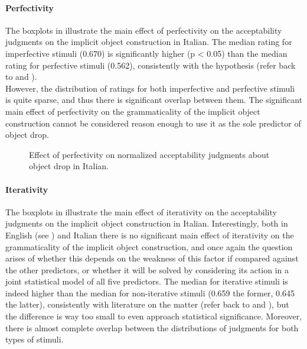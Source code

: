 \paragraph{Perfectivity}
The boxplots in  illustrate the main effect of perfectivity on the acceptability judgments on the implicit object construction in Italian. The median rating for imperfective stimuli (0.670) is significantly higher (p < 0.05) than the median rating for perfective stimuli (0.562), consistently with the hypothesis (refer back to  and ).\\
However, the distribution of ratings for both imperfective and perfective stimuli is quite sparse, and thus there is significant overlap between them. The significant main effect of perfectivity on the grammaticality of the implicit object construction cannot be considered reason enough to use it as the sole predictor of object drop.

\begin{figure}[htb]
\caption{Effect of perfectivity on normalized acceptability judgments about object drop in Italian.}
    
\end{figure}

\paragraph{Iterativity}
The boxplots in  illustrate the main effect of iterativity on the acceptability judgments on the implicit object construction in Italian. Interestingly, both in English (see ) and Italian there is no significant main effect of iterativity on the grammaticality of the implicit object construction, and once again the question arises of whether this depends on the weakness of this factor if compared against the other predictors, or whether it will be solved by considering its action in a joint statistical model of all five predictors. The median for iterative stimuli is indeed higher than the median for non-iterative stimuli (0.659 the former, 0.645 the latter), consistently with literature on the matter (refer back to  and ), but the difference is way too small to even approach statistical significance. Moreover, there is almost complete overlap between the distributions of judgments for both types of stimuli.

